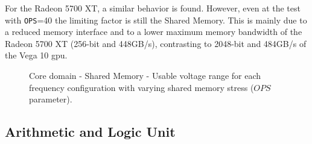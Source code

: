 For the Radeon 5700 XT, a similar behavior is found. However, even at the test with \texttt{OPS}=40 the limiting factor is still the Shared Memory. This is mainly due to a reduced memory interface and to a lower maximum memory bandwidth of the Radeon 5700 XT (256-bit and 448GB/s), contrasting to 2048-bit and 484GB/s of the Vega 10 \acrshort{gpu}.


\begin{figure}[!htb]
    \centering
    \begin{subfigmatrix}{2}
      \label{fig:SharedMemory_guardband}
    \end{subfigmatrix}
    \caption{Core domain - Shared Memory - Usable voltage range for each frequency configuration with varying shared memory stress ($OPS$ parameter).}
\end{figure}

\subsection{Arithmetic and Logic Unit}

